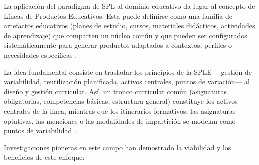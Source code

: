 La aplicación del paradigma de \ac{SPL} al dominio educativo da lugar al concepto 
de Líneas de Productos Educativos. 
Esta puede definirse como una familia de artefactos 
educativos (planes de estudio, cursos, materiales didácticos, actividades de aprendizaje) 
que comparten un núcleo común y que pueden ser configurados sistemáticamente para generar 
productos adaptados a contextos, perfiles o necesidades 
específicas \citep{okada2009methodology, chimalakonda2012accelerating}.

La idea fundamental consiste en trasladar los principios de la \ac{SPLE} —gestión de 
variabilidad, reutilización planificada, activos centrales, puntos de variación— al 
diseño y gestión curricular. Así, un tronco curricular común
(asignaturas obligatorias, competencias básicas, estructura general) constituye los 
activos centrales de la línea, mientras que los itinerarios formativos, 
las asignaturas optativas, las menciones o las modalidades de 
impartición se modelan como puntos de variabilidad \citep{silva2017towards}.

Investigaciones pioneras en este campo han demostrado la viabilidad y los beneficios de 
este enfoque:

